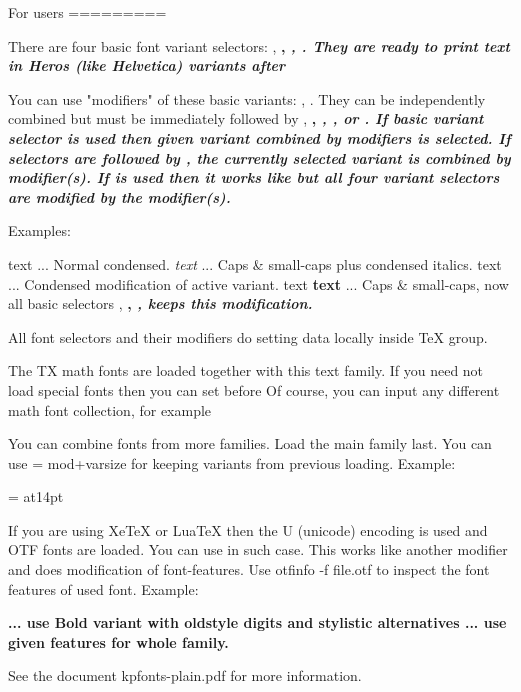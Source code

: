 For users
=========

There are four basic font variant selectors: \rm, \bf, \it, \bi. They are ready
to print text in Heros (like Helvetica) variants after 

You can use "modifiers" of these basic variants: \cond, \caps. They can be
independently combined but must be immediately followed by \rm, \bf, \it,
\bi, \one or \fam. If basic variant selector is used then given variant
combined by modifiers is selected. If selectors are followed by \one, the
currently selected variant is combined by modifier(s). If \fam is used then it
works like \one but all four variant selectors are modified by the
modifier(s).

Examples:

{\cond\rm text}           ... Normal condensed.
{\caps\cond\it text}      ... Caps & small-caps plus condensed italics.
{\cond\one text}          ... Condensed modification of active variant.
{\caps\fam text \bf text} ... Caps & small-caps, now all basic selectors
                              \rm, \bf, \it, \bi keeps this modification.

All font selectors and their modifiers do setting data locally inside TeX
group.

The TX math fonts are loaded together with this text family. If you need not
load special fonts then you can set \let\loadmathfonts=\relax before 
 Of course, you can input any different math font collection, 
for example 

You can combine fonts from more families. Load the main family last. You can
use \ffletfont\newselector = {mod+var}{size} for keeping variants from
previous loading. Example:

 
\ffletfont \titlefont = {\cond\bf}{at14pt} %

If you are using XeTeX or LuaTeX then the U (unicode) encoding is used and
OTF fonts are loaded. You can use  in such case. This works like
another modifier and does modification of font-features. Use 
otfinfo -f file.otf to inspect the font features of used font. Example:

\bf  ... use Bold variant with oldstyle digits and
                            stylistic alternatives
\fam ... use given features for whole family.

See the document kpfonts-plain.pdf for more information. 


